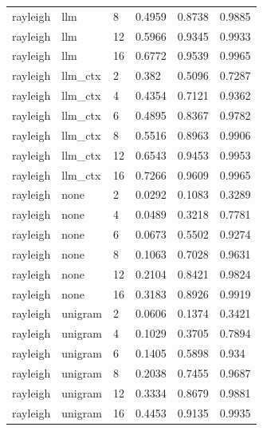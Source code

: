 \begin{tabular}{llllll}
rayleigh & llm & 8 & 0.4959 & 0.8738 & 0.9885 \\
rayleigh & llm & 12 & 0.5966 & 0.9345 & 0.9933 \\
rayleigh & llm & 16 & 0.6772 & 0.9539 & 0.9965 \\
rayleigh & llm\_ctx & 2 & 0.382 & 0.5096 & 0.7287 \\
rayleigh & llm\_ctx & 4 & 0.4354 & 0.7121 & 0.9362 \\
rayleigh & llm\_ctx & 6 & 0.4895 & 0.8367 & 0.9782 \\
rayleigh & llm\_ctx & 8 & 0.5516 & 0.8963 & 0.9906 \\
rayleigh & llm\_ctx & 12 & 0.6543 & 0.9453 & 0.9953 \\
rayleigh & llm\_ctx & 16 & 0.7266 & 0.9609 & 0.9965 \\
rayleigh & none & 2 & 0.0292 & 0.1083 & 0.3289 \\
rayleigh & none & 4 & 0.0489 & 0.3218 & 0.7781 \\
rayleigh & none & 6 & 0.0673 & 0.5502 & 0.9274 \\
rayleigh & none & 8 & 0.1063 & 0.7028 & 0.9631 \\
rayleigh & none & 12 & 0.2104 & 0.8421 & 0.9824 \\
rayleigh & none & 16 & 0.3183 & 0.8926 & 0.9919 \\
rayleigh & unigram & 2 & 0.0606 & 0.1374 & 0.3421 \\
rayleigh & unigram & 4 & 0.1029 & 0.3705 & 0.7894 \\
rayleigh & unigram & 6 & 0.1405 & 0.5898 & 0.934 \\
rayleigh & unigram & 8 & 0.2038 & 0.7455 & 0.9687 \\
rayleigh & unigram & 12 & 0.3334 & 0.8679 & 0.9881 \\
rayleigh & unigram & 16 & 0.4453 & 0.9135 & 0.9935 \\
\hline
\end{tabular}
